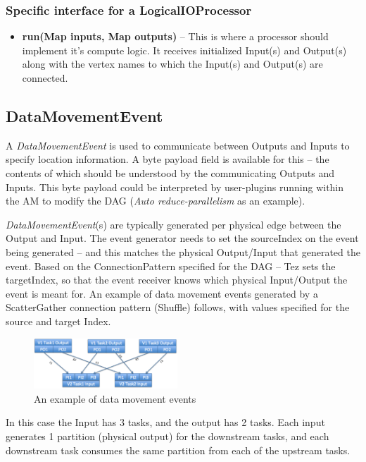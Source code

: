\documentclass[twocolumn]{article}
\newcommand{\bi}{\begin{itemize}}
\newcommand{\ei}{\end{itemize}}
\newcommand{\ii}{\item}
\begin{document}
\subsubsection*{Specific interface for a LogicalIOProcessor}

\bi
\ii \textbf{run(Map inputs, Map outputs)} -- This is where a processor should
implement it's compute logic. It receives initialized Input(s) and
Output(s) along with the vertex names to which the Input(s) and
Output(s) are connected.
\ei
\subsection{DataMovementEvent}

A \textit{DataMovementEvent} is used to communicate between Outputs and Inputs to
specify location information. A byte payload field is available for this
-- the contents of which should be understood by the communicating
Outputs and Inputs. This byte payload could be interpreted by
user-plugins running within the AM to modify the DAG (\textit{Auto
reduce-parallelism} as an example).

\textit{DataMovementEvent}(s) are typically generated per physical edge between
the Output and Input. The event generator needs to set the sourceIndex
on the event being generated -- and this matches the physical
Output/Input that generated the event. Based on the ConnectionPattern
specified for the DAG -- Tez sets the targetIndex, so that the event
receiver knows which physical Input/Output the event is meant for. An
example of data movement events generated by a ScatterGather connection
pattern (Shuffle) follows, with values specified for the source and
target Index.

\begin{figure}[htb]
        \centering
        \includegraphics[width=0.48\textwidth]{tez02}
        \caption{An example of data movement events}
        \label{fig14}
\end{figure}

In this case the Input has 3 tasks, and the output has 2 tasks. Each
input generates 1 partition (physical output) for the downstream tasks,
and each downstream task consumes the same partition from each of the
upstream tasks.
\end{document}
